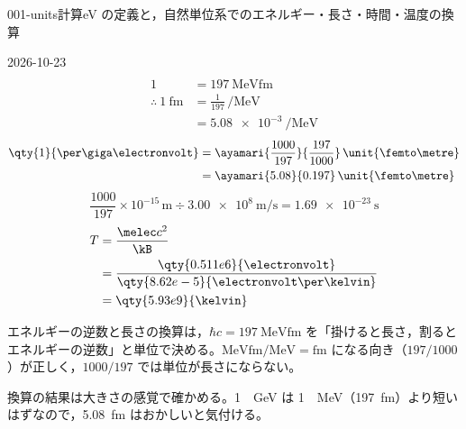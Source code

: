 \documentclass[uplatex,dvipdfmx,a4paper,11pt]{jsarticle}
\begin{document}
\begin{mondai}{001-units}{計算}{eV の定義と，自然単位系でのエネルギー・長さ・時間・温度の換算}
\begin{kotaeutsushi}{2026-10-23}
\begin{align*}
\end{align*}
\begin{align*}
  1&=\qty{197}{\mega\electronvolt\femto\metre}\\
  \therefore\ \qty{1}{\femto\metre}&=\frac{1}{197}\,\unit{\per\mega\electronvolt}\\
  &=\qty{5.08e-3}{\per\mega\electronvolt}
\end{align*}
\begin{align*}
  \qty{1}{\per\giga\electronvolt}&=\ayamari{\frac{1000}{197}}{\frac{197}{1000}}\,\unit{\femto\metre}\\
  &=\ayamari{5.08}{0.197}\,\unit{\femto\metre}
\end{align*}
\[ \frac{1000}{197}\times10^{-15}\,\unit{\metre}\div\qty{3.00e8}{\metre\per\second}=\qty{1.69e-23}{\second} \]
\begin{align*}
  T&=\frac{\melec c^{2}}{\kB}\\
  &=\frac{\qty{0.511e6}{\electronvolt}}{\qty{8.62e-5}{\electronvolt\per\kelvin}}\\
  &=\qty{5.93e9}{\kelvin}
\end{align*}
\end{kotaeutsushi}
\begin{kizuki}
\item エネルギーの逆数と長さの換算は，$\hbar c=\qty{197}{\mega\electronvolt\femto\metre}$ を「掛けると長さ，割るとエネルギーの逆数」と単位で決める。$\unit{\mega\electronvolt\femto\metre}/\unit{\mega\electronvolt}=\unit{\femto\metre}$ になる向き（$197/1000$）が正しく，$1000/197$ では単位が長さにならない。
\item 換算の結果は大きさの感覚で確かめる。\qty{1}{\per\giga\electronvolt} は \qty{1}{\per\mega\electronvolt}（\qty{197}{\femto\metre}）より短いはずなので，\qty{5.08}{\femto\metre} はおかしいと気付ける。

\end{kizuki}
\end{mondai}
\end{document}
